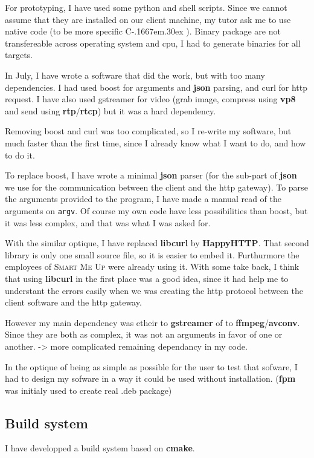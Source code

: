 \documentclass[a4paper,11pt]{custom}
\newcommand{\smu}{\textsc{Smart Me Up}}
\newcommand{\rtp}{\textbf{rtp}}
\newcommand{\rtcp}{\textbf{rtcp}}
\newcommand{\avconv}{\textbf{avconv}}
\newcommand{\ffmpeg}{\textbf{ffmpeg}}
\newcommand{\gstreamer}{\textbf{gstreamer}}
\newcommand{\happyhttp}{\textbf{HappyHTTP}}
\newcommand{\libcurl}{\textbf{libcurl}}
\newcommand{\vpx}{\textbf{vp8}}
\newcommand{\cmake}{\textbf{cmake}}
\newcommand{\fpm}{\textbf{fpm}}
\newcommand{\cpp}{%
  C\kern-.1667em\raise.30ex\hbox{\smaller{++}}%
  \spacefactor1000%
}
\newcommand{\json}{\textbf{json}}
\begin{document}
For prototyping, I have used some python and shell scripts. Since we cannot
assume that they are installed on our client machine, my tutor ask me to use
native code (to be more specific \cpp). Binary package are not transfereable
across operating system and cpu, I had to generate binaries for all targets.

In July, I have wrote a software that did the work, but with too many
dependencies. I had used boost for arguments and \json{} parsing, and curl for http
request. I have also used gstreamer for video (grab image, compress using \vpx{}
and send using \rtp/\rtcp) but it was a hard dependency.

Removing boost and curl was too complicated, so I re-write my software, but much
faster than the first time, since I already know what I want to do, and how to
do it.

To replace boost, I have wrote a minimal \json{} parser (for the sub-part of
\json{} we use for the communication between the client and the http gateway).
To parse the arguments provided to the program, I have made a manual read of
the arguments on \verb+argv+. Of course my own code have less possibilities than
boost, but it was less complex, and that was what I was asked for.

With the similar optique, I have replaced \libcurl{} by \happyhttp. That second
library is only one small source file, so it is easier to embed it. Furthurmore
the employees of \smu{} were already using it. With some take back, I think that
using \libcurl{} in the first place was a good idea, since it had help me to
understant the errors easily when we was creating the http protocol between the
client software and the http gateway.

However my main dependency was etheir to \gstreamer{} of to \ffmpeg/\avconv. Since
they are both as complex, it was not an arguments in favor of one or another.
-> more complicated remaining dependancy in my code.

In the optique of being as simple as possible for the user to test that sofware,
I had to design my sofware in a way it could be used without installation.
(\fpm{} was initialy used to create real .deb package)

\subsection{Build system}

I have developped a build system based on \cmake.
\end{document}
